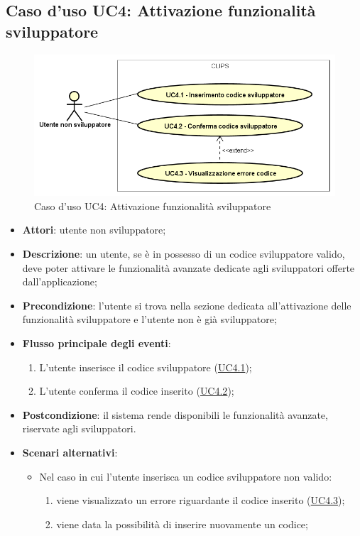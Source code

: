 \documentclass[../AnalisiDeiRequisiti.tex]{subfiles}
\begin{document}
\subsection{Caso d'uso UC4: Attivazione funzionalità sviluppatore}

        \begin{figure}[H]
            \centering
            \includegraphics[scale=0.95, width=\textwidth]{img/UC4.png}
            \caption{Caso d'uso UC4: Attivazione funzionalità sviluppatore}\label{fig:UC4} 
        \end{figure}
\begin{itemize}
\item \textbf{Attori}: utente non sviluppatore;
\item \textbf{Descrizione}: un utente, se è in possesso di un codice sviluppatore valido, deve poter attivare le funzionalità avanzate dedicate agli sviluppatori offerte dall'applicazione; 
      \item \textbf{Precondizione}: l'utente si trova nella sezione dedicata all'attivazione delle funzionalità sviluppatore e l'utente non è già sviluppatore;

        \item \textbf{Flusso principale degli eventi}:
          \begin{enumerate}
          \item L'utente inserisce il codice sviluppatore (\hyperlink{UC4.1}{UC4.1});
          \item L'utente conferma il codice inserito (\hyperlink{UC4.2}{UC4.2});

      \end{enumerate}
    \item \textbf{Postcondizione}: il sistema rende disponibili le funzionalità avanzate, riservate agli sviluppatori.
     \item \textbf{Scenari alternativi}: 
      \begin{itemize}
       \item Nel caso in cui l'utente inserisca un codice sviluppatore non valido: 
       \begin{enumerate}
          \item viene visualizzato un errore riguardante il codice inserito (\hyperlink{UC4.3}{UC4.3});
          \item viene data la possibilità di inserire nuovamente un codice;
       \end{enumerate}
      \end{itemize}
  \end{itemize}
\hypertarget{UC4.1}{}
\end{document}

